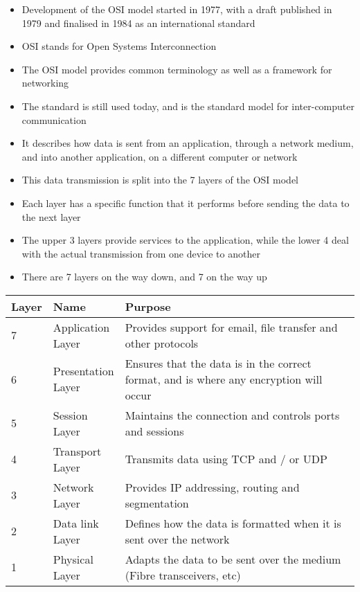 
\begin{itemize}
  \item Development of the OSI model started in 1977, with a draft published in 1979 and finalised in 1984 as an international standard
  \item OSI stands for Open Systems Interconnection
  \item The OSI model provides common terminology as well as a framework for networking
  \item The standard is still used today, and is the standard model for inter-computer communication
  \item It describes how data is sent from an application, through a network medium, and into another application, on a different computer or network
  \item This data transmission is split into the 7 layers of the OSI model
  \item Each layer has a specific function that it performs before sending the data to the next layer
  \item The upper 3 layers provide services to the application, while the lower 4 deal with the actual transmission from one device to another
  \item There are 7 layers on the way down, and 7 on the way up
\end{itemize}

\begin{center}
  \begin{tabular}{ |p{0.075\linewidth}|p{0.2\linewidth}|p{0.725\linewidth}| }
    \hline
    Layer & Name & Purpose \\
    \hline
    7 & Application Layer & Provides support for email, file transfer and other protocols \\
    6 & Presentation Layer & Ensures that the data is in the correct format, and is where any encryption will occur \\
    5 & Session Layer & Maintains the connection and controls ports and sessions \\
    4 & Transport Layer & Transmits data using TCP and / or UDP \\
    3 & Network Layer & Provides IP addressing, routing and segmentation \\
    2 & Data link Layer & Defines how the data is formatted when it is sent over the network \\
    1 & Physical Layer & Adapts the data to be sent over the medium (Fibre transceivers, etc) \\
    \hline
  \end{tabular}
\end{center}
  
